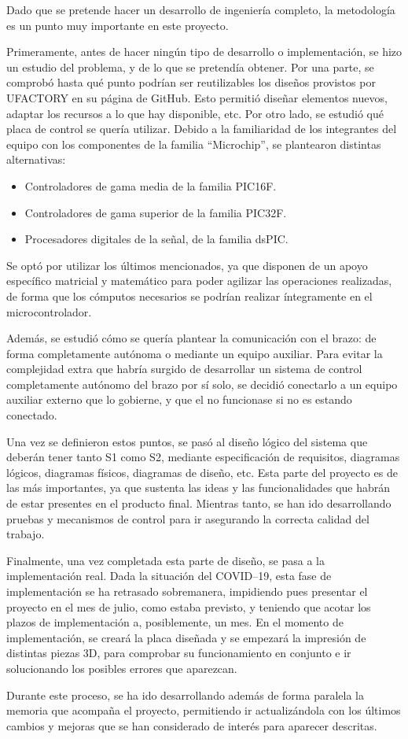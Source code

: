 Dado que se pretende hacer un desarrollo de ingeniería completo, la metodología es un
punto muy importante en este proyecto.

Primeramente, antes de hacer ningún tipo de desarrollo o implementación, se hizo un
estudio del problema, y de lo que se pretendía obtener. Por una parte, se comprobó
hasta qué punto podrían ser reutilizables los diseños provistos por UFACTORY
en su página de GitHub. Esto permitió diseñar elementos nuevos, adaptar los recursos
a lo que hay disponible, etc. 
Por otro lado, se estudió qué placa de control se quería utilizar. Debido a la familiaridad
de los integrantes del equipo con los componentes de la familia ``Microchip'', se plantearon
distintas alternativas:

\begin{itemize}
    \item Controladores de gama media de la familia PIC16F.
    \item Controladores de gama superior de la familia PIC32F.
    \item Procesadores digitales de la señal, de la familia dsPIC.
\end{itemize}

Se optó por utilizar los últimos mencionados, ya que disponen de un apoyo específico
matricial y matemático para poder agilizar las operaciones realizadas, de forma que
los cómputos necesarios se podrían realizar íntegramente en el microcontrolador.

Además, se estudió cómo se quería plantear la comunicación con el brazo: de forma
completamente autónoma o mediante un equipo auxiliar. Para evitar la complejidad extra
que habría surgido de desarrollar un sistema de control completamente autónomo del brazo
por sí solo, se decidió conectarlo a un equipo auxiliar externo que lo gobierne, y que
el \pArm{} no funcionase si no es estando conectado.

Una vez se definieron estos puntos, se pasó al diseño lógico del sistema que deberán
tener tanto \ac{S1} como \ac{S2}, mediante especificación de requisitos, diagramas lógicos,
diagramas físicos, diagramas de diseño, etc. Esta parte del proyecto es de las más 
importantes, ya que sustenta las ideas y las funcionalidades que habrán de estar presentes
en el producto final. Mientras tanto, se han ido desarrollando pruebas y mecanismos de
control para ir asegurando la correcta calidad del trabajo.

Finalmente, una vez completada esta parte de diseño, se pasa a la implementación real.
Dada la situación del COVID--19, esta fase de implementación se ha retrasado sobremanera,
impidiendo pues presentar el proyecto en el mes de julio, como estaba previsto, y teniendo
que acotar los plazos de implementación a, posiblemente, un mes. En el momento de
implementación, se creará la placa diseñada y se empezará la impresión de distintas piezas
3D, para comprobar su funcionamiento en conjunto e ir solucionando los posibles errores
que aparezcan.

Durante este proceso, se ha ido desarrollando además de forma paralela la memoria que 
acompaña el proyecto, permitiendo ir actualizándola con los últimos cambios y mejoras que
se han considerado de interés para aparecer descritas.